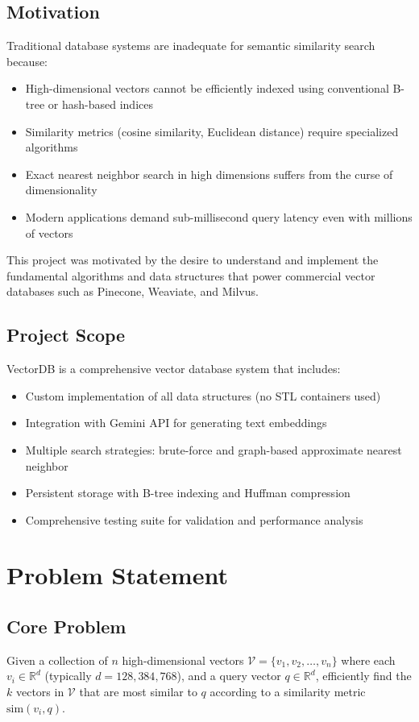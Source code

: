 \documentclass[12pt,a4paper]{article}
\begin{document}
\subsection{Motivation}
Traditional database systems are inadequate for semantic similarity search because:
\begin{itemize}
    \item High-dimensional vectors cannot be efficiently indexed using conventional B-tree or hash-based indices
    \item Similarity metrics (cosine similarity, Euclidean distance) require specialized algorithms
    \item Exact nearest neighbor search in high dimensions suffers from the curse of dimensionality
    \item Modern applications demand sub-millisecond query latency even with millions of vectors
\end{itemize}

This project was motivated by the desire to understand and implement the fundamental algorithms and data structures that power commercial vector databases such as Pinecone, Weaviate, and Milvus.

\subsection{Project Scope}
VectorDB is a comprehensive vector database system that includes:
\begin{itemize}
    \item Custom implementation of all data structures (no STL containers used)
    \item Integration with Gemini API for generating text embeddings
    \item Multiple search strategies: brute-force and graph-based approximate nearest neighbor
    \item Persistent storage with B-tree indexing and Huffman compression
    \item Comprehensive testing suite for validation and performance analysis
\end{itemize}

\section{Problem Statement}

\subsection{Core Problem}
Given a collection of $n$ high-dimensional vectors $\mathcal{V} = \{v_1, v_2, \ldots, v_n\}$ where each $v_i \in \mathbb{R}^d$ (typically $d = 128, 384, 768$), and a query vector $q \in \mathbb{R}^d$, efficiently find the $k$ vectors in $\mathcal{V}$ that are most similar to $q$ according to a similarity metric $\text{sim}(v_i, q)$.
\end{document}
